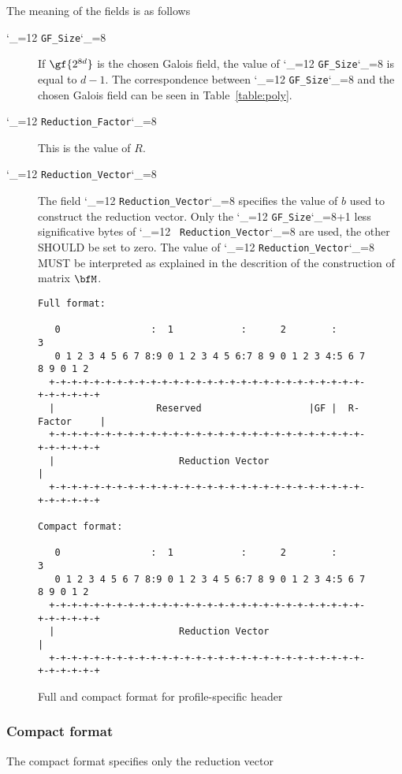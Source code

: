 \documentclass{rfc}
\def\ttt{\catcode`\_=12 \tttii}
\def\tttii#1!{{\tt #1}\catcode`\_=8{}}
\begin{document}
The meaning of the fields is as follows

\begin{description}
  \item[\ttt GF\_Size!] If $\gf{2^{8d}}$ is the chosen Galois field,
  the value of \ttt GF_Size! is equal to $d-1$.  The correspondence
  between \ttt GF_Size! and the chosen Galois field can be seen in
  Table~\ref{table:poly}.
  \item[{\ttt Reduction\_Factor!}] This is the value of $R$.
  \item[\ttt Reduction\_Vector!] The field \ttt Reduction_Vector!
specifies the value of $b$ used to construct the reduction vector.
Only the \ttt GF_Size!+1 less significative bytes of \ttt
Reduction_Vector! are used, the other SHOULD be set to zero.  The
value of \ttt Reduction_Vector! MUST be
interpreted as explained in the descrition of the construction of
matrix $\bfM$.
\end{description}


\begin{figure}
\begin{center}
\begin{verbatim}
Full format:

   0                :  1            :      2        :          3
   0 1 2 3 4 5 6 7 8:9 0 1 2 3 4 5 6:7 8 9 0 1 2 3 4:5 6 7 8 9 0 1 2
  +-+-+-+-+-+-+-+-+-+-+-+-+-+-+-+-+-+-+-+-+-+-+-+-+-+-+-+-+-+-+-+-+-+
  |                  Reserved                   |GF |  R-Factor     |
  +-+-+-+-+-+-+-+-+-+-+-+-+-+-+-+-+-+-+-+-+-+-+-+-+-+-+-+-+-+-+-+-+-+
  |                      Reduction Vector                           |
  +-+-+-+-+-+-+-+-+-+-+-+-+-+-+-+-+-+-+-+-+-+-+-+-+-+-+-+-+-+-+-+-+-+

Compact format:

   0                :  1            :      2        :          3
   0 1 2 3 4 5 6 7 8:9 0 1 2 3 4 5 6:7 8 9 0 1 2 3 4:5 6 7 8 9 0 1 2
  +-+-+-+-+-+-+-+-+-+-+-+-+-+-+-+-+-+-+-+-+-+-+-+-+-+-+-+-+-+-+-+-+-+
  |                      Reduction Vector                           |
  +-+-+-+-+-+-+-+-+-+-+-+-+-+-+-+-+-+-+-+-+-+-+-+-+-+-+-+-+-+-+-+-+-+
\end{verbatim}
\end{center}
\caption{Full and compact format for profile-specific header \label{fig:full}}
\end{figure}

\subsubsection{Compact format} The compact format specifies only the
reduction vector
\end{document}
